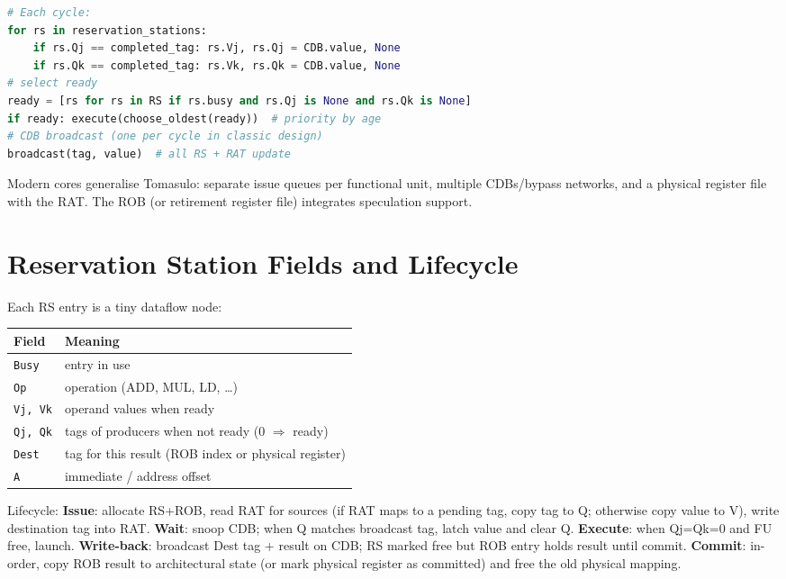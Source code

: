 \begin{lstlisting}[language=Python, caption={Tomasulo wake-up and select (simplified)}, label={lst:tomasulo}]
# Each cycle:
for rs in reservation_stations:
    if rs.Qj == completed_tag: rs.Vj, rs.Qj = CDB.value, None
    if rs.Qk == completed_tag: rs.Vk, rs.Qk = CDB.value, None
# select ready
ready = [rs for rs in RS if rs.busy and rs.Qj is None and rs.Qk is None]
if ready: execute(choose_oldest(ready))  # priority by age
# CDB broadcast (one per cycle in classic design)
broadcast(tag, value)  # all RS + RAT update
\end{lstlisting}

Modern cores generalise Tomasulo: separate issue queues per functional unit, multiple CDBs/bypass networks, and a physical register file with the RAT. The ROB (or retirement register file) integrates speculation support.

\section{Reservation Station Fields and Lifecycle}
Each RS entry is a tiny dataflow node:

\begin{center}
\begin{tabular}{lp{9cm}}
\toprule Field & Meaning \\ \midrule
\texttt{Busy} & entry in use \\
\texttt{Op} & operation (ADD, MUL, LD, \dots) \\
\texttt{Vj, Vk} & operand values when ready \\
\texttt{Qj, Qk} & tags of producers when not ready (0 $\Rightarrow$ ready) \\
\texttt{Dest} & tag for this result (ROB index or physical register) \\
\texttt{A} & immediate / address offset \\ \bottomrule
\end{tabular}
\end{center}

Lifecycle: \textbf{Issue}: allocate RS+ROB, read RAT for sources (if RAT maps to a pending tag, copy tag to Q; otherwise copy value to V), write destination tag into RAT. \textbf{Wait}: snoop CDB; when Q matches broadcast tag, latch value and clear Q. \textbf{Execute}: when Qj=Qk=0 and FU free, launch. \textbf{Write-back}: broadcast Dest tag + result on CDB; RS marked free but ROB entry holds result until commit. \textbf{Commit}: in-order, copy ROB result to architectural state (or mark physical register as committed) and free the old physical mapping.

